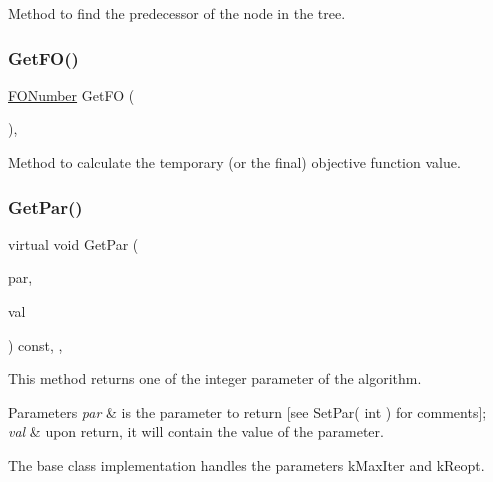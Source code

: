Method to find the predecessor of the node in the tree. \mbox{\label{class_m_c_f_simplex_a76e7e63ab3db6b52b69a6a2db640e3ec}} 
\subsubsection{\texorpdfstring{Get\+F\+O()}{GetFO()}}
{\footnotesize\ttfamily \mbox{\hyperlink{class_m_c_f_class_af5ee7b3099b0bc780a6a4b43629488fa}{F\+O\+Number}} Get\+FO (\begin{DoxyParamCaption}\item[{void}]{ }\end{DoxyParamCaption})\hspace{0.3cm}{\ttfamily [inline]}, {\ttfamily [private]}}

Method to calculate the temporary (or the final) objective function value. \mbox{\label{class_m_c_f_simplex_aebb293732f2fd2767e9ebc5e8ccae338}} 
\subsubsection{\texorpdfstring{Get\+Par()}{GetPar()}\hspace{0.1cm}{\footnotesize\ttfamily [1/2]}}
{\footnotesize\ttfamily virtual void Get\+Par (\begin{DoxyParamCaption}\item[{int}]{par,  }\item[{int \&}]{val }\end{DoxyParamCaption}) const\hspace{0.3cm}{\ttfamily [inline]}, {\ttfamily [override]}, {\ttfamily [virtual]}}

This method returns one of the integer parameter of the algorithm.


\begin{DoxyParams}{Parameters}
{\em par} & is the parameter to return \mbox{[}see Set\+Par( int ) for comments\mbox{]};\\
\hline
{\em val} & upon return, it will contain the value of the parameter.\\
\hline
\end{DoxyParams}
The base class implementation handles the parameters k\+Max\+Iter and k\+Reopt. 

